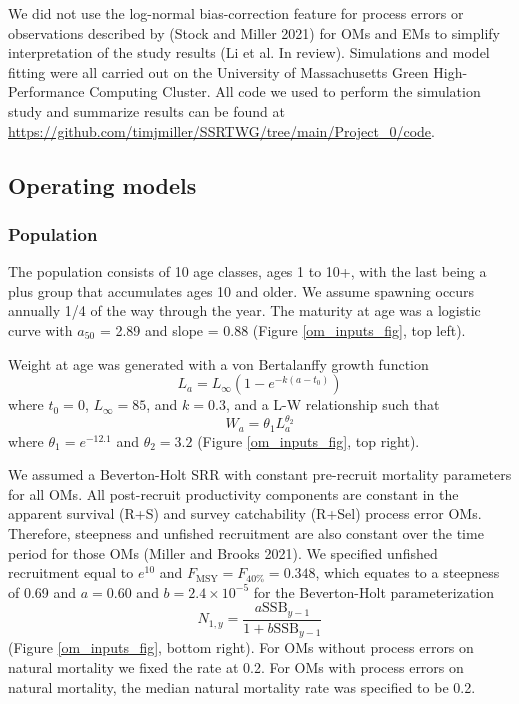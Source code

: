 \documentclass[
  12pt,
]{article}
\newcommand{\Fmsy}{\ensuremath{F_{\text{MSY}}}\xspace}
\begin{document}
We did not use the log-normal bias-correction feature for process errors
or observations described by (Stock and Miller 2021) for OMs and EMs to
simplify interpretation of the study results (Li et al. In review).
Simulations and model fitting were all carried out on the University of
Massachusetts Green High-Performance Computing Cluster. All code we used
to perform the simulation study and summarize results can be found at
\url{https://github.com/timjmiller/SSRTWG/tree/main/Project_0/code}.

\hypertarget{operating-models}{%
\subsection*{Operating models}\label{operating-models}}

\hypertarget{population}{%
\subsubsection*{Population}\label{population}}

The population consists of 10 age classes, ages 1 to 10+, with the last
being a plus group that accumulates ages 10 and older. We assume
spawning occurs annually 1/4 of the way through the year. The maturity
at age was a logistic curve with \(a_{50}\) = 2.89 and slope = 0.88
(Figure \ref{om_inputs_fig}, top left).

Weight at age was generated with a von Bertalanffy growth function \[
L_a = L_{\infty}\left(1 - e^{-k(a - t_0)}\right)
\] where \(t_0 = 0\), \(L_\infty = 85\), and \(k = 0.3\), and a L-W
relationship such that \[
W_a = \theta_1 L_a^{\theta_2}
\] where \(\theta_1 = e^{-12.1}\) and \(\theta_2 = 3.2\) (Figure
\ref{om_inputs_fig}, top right).

We assumed a Beverton-Holt SRR with constant pre-recruit mortality
parameters for all OMs. All post-recruit productivity components are
constant in the apparent survival (R+S) and survey catchability (R+Sel)
process error OMs. Therefore, steepness and unfished recruitment are
also constant over the time period for those OMs (Miller and Brooks
2021). We specified unfished recruitment equal to \(e^{10}\) and
\(\Fmsy = F_{40\%} = 0.348\), which equates to a steepness of 0.69 and
\(a=0.60\) and \(b = 2.4 \times 10^{-5}\) for the Beverton-Holt
parameterization \[
N_{1,y} = \frac{a \text{SSB}_{y-1}}{1 + b \text{SSB}_{y-1}} 
\] (Figure \ref{om_inputs_fig}, bottom right). For OMs without process
errors on natural mortality we fixed the rate at 0.2. For OMs with
process errors on natural mortality, the median natural mortality rate
was specified to be 0.2.
\end{document}
